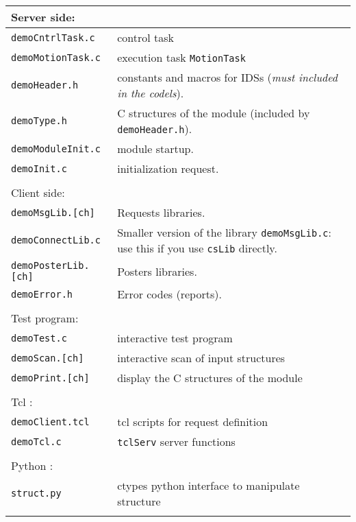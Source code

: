 \begin{center}\small
 \begin{tabularx}{\linewidth}{|l|X|}
 \hline
 \multicolumn{2}{|l|}{Server side: } \\
 \hline
 \texttt{demoCntrlTask.c}& control task \\
 \texttt{demoMotionTask.c}& execution task \texttt{MotionTask}  \\
 \texttt{demoHeader.h}&  constants and macros for IDSs (\emph{must included
in the codels}). \\
 \texttt{demoType.h}&  C structures of the module
 (included by \texttt{demoHeader.h}). \\ 
 \texttt{demoModuleInit.c}& module startup. \\
 \texttt{demoInit.c}& initialization request.  \\
 \hline
 \multicolumn{2}{l}{} \\

 \hline
 \multicolumn{2}{|l|}{Client side: } \\
 \hline
 \texttt{demoMsgLib.[ch]}  &  Requests libraries. \\
 \texttt{demoConnectLib.c}  &  Smaller version of the library 
\texttt{demoMsgLib.c}: use this if you use \texttt{csLib} directly. \\
 \texttt{demoPosterLib.[ch]}  &  Posters libraries.\\
 \texttt{demoError.h}  &  Error codes (reports).\\
 \hline
 \multicolumn{2}{l}{} \\

 \hline
 \multicolumn{2}{|l|}{Test program:} \\
 \hline
 \texttt{demoTest.c}  &  interactive test program\\
 \texttt{demoScan.[ch]}  &  interactive  scan of input structures\\
 \texttt{demoPrint.[ch]}  &  display the C structures of the module\\
 \hline
 \multicolumn{2}{l}{} \\

 \hline
 \multicolumn{2}{|l|}{Tcl :} \\
 \hline
 \texttt{demoClient.tcl}  &  tcl scripts for request definition\\
 \texttt{demoTcl.c}  &   \texttt{tclServ} server functions\\
 \hline
 \multicolumn{2}{l}{} \\

 \hline
 \multicolumn{2}{|l|}{Python :} \\
 \hline
 \texttt{struct.py}  &  ctypes python interface to manipulate structure\\
 \hline
 \multicolumn{2}{l}{} \\


\end{tabularx}
\end{center}
